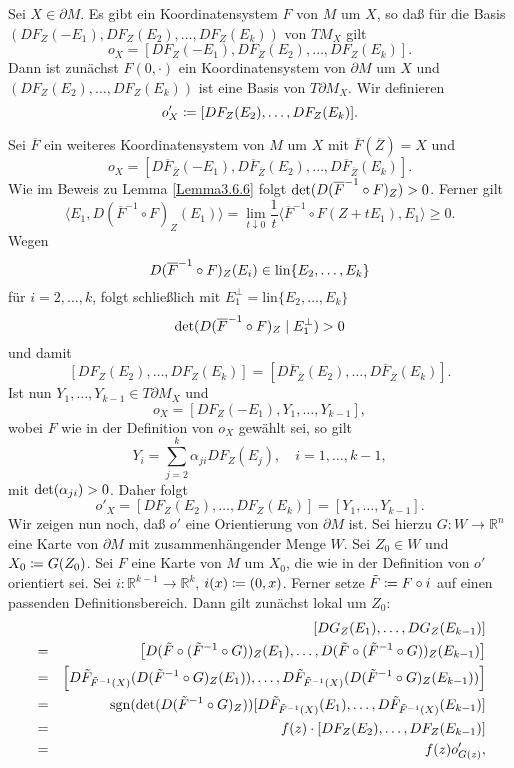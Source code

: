 \documentclass[a4paper,twoside,DIV15,BCOR12mm]{scrbook}
\DeclareMathOperator{\sgn}{sgn}
\begin{document}
\bigskip




  Sei $X \in \partial M$. Es gibt 
ein Koordinatensystem $F$ von $M$ um $X$, so daß für die Basis 
$(DF_{Z}(-E_{1}), DF_{Z}(E_{2}),\dots,DF_{Z}(E_{k}))$ von $TM_{X}$ 
gilt
\[ o_{X} = [DF_{Z}(- E_{1}), DF_{Z}(E_{2}),\dots,DF_{Z}(E_{k})]. \]
Dann ist zunächst $F(0,\cdot)$ ein Koordinatensystem von $\partial M$ 
um $X$ und $(DF_{Z}(E_{2}),\dots,DF_{Z}(E_{k}))$ ist eine Basis von 
$T\partial M_{X}$. Wir definieren
\[ o'_{X} \da  [DF_{Z}(E_{2}),\dots,DF_{Z}(E_{k})]. \]

\bigskip

 Sei $\overline{F}$ ein weiteres 
Koordinatensystem von $M$ um $X$ mit $\overline{F}(\overline{Z}) = X$ 
und
\[ o_{X} = [D\overline{F}_{\overline{Z}}(-E_{1}), 
D\overline{F}_{\overline{Z}}(E_{2}),\dots,D\overline{F}_{\overline{Z}}(E_{k})]. 
\]
Wie im Beweis zu Lemma \ref{Lemma3.6.6} folgt ${\rm det}(D(\overline{F}^{-1} 
\circ F)_{Z}) > 0$. Ferner gilt
\[
\langle E_{1},D(\overline{F}^{-1} \circ F)_{Z}(E_{1})\rangle  =  
\lim_{t \downarrow 0} \frac{1}{t} \langle \overline{F}^{-1} \circ 
F(Z + tE_{1}), E_{1} \rangle  \ge  0.
\]
Wegen
\[ D(\overline{F}^{-1} \circ F)_{Z} (E_{i}) \in {\rm 
lin}\{E_{2},\dots,E_{k}\} \]
für $i = 2,\dots,k$, folgt schließlich mit $E_1^\perp=\text{lin}\{E_2,\ldots,E_k\}$
\[ {\rm det}(D(\overline{F}^{-1} \circ F)_{Z} \mid E_{1}^{\perp}) > 
0 \]
und damit
\[ [DF_{Z}(E_{2}),\dots,DF_{Z}(E_{k})] = 
[D\overline{F}_{\overline{Z}}(E_{2}),\dots,D\overline{F}_{\overline{Z}}(E_{k})]. 
\]
Ist nun $Y_{1},\dots,Y_{k-1} \in T\partial M_{X}$ und
\[ o_{X} = [DF_{Z}(-E_{1}),Y_{1},\dots,Y_{k-1}], \]
wobei $F$ wie in der Definition von $o_{X}$ gewählt sei, so gilt
\[ Y_{i} = \sum_{j=2}^{k} \alpha_{ji} DF_{Z} (E_{j}), \quad i = 
1,\dots,k-1, \]
mit ${\rm det}(\alpha_{ji}) > 0$. 
Daher folgt
\[ o'_{X} = [DF_{Z}(E_{2}),\dots,DF_{Z}(E_{k})] = 
[Y_{1},\dots,Y_{k-1}]. \]
Wir zeigen nun noch, daß $o'$ eine Orientierung von $\partial M$ 
ist. Sei hierzu $G: W \to {\mathbb R}^{n}$ eine Karte von $\partial 
M$ mit zusammenhängender Menge $W$. Sei $Z_{0} \in W$ und $X_{0} \da  
G(Z_{0})$. Sei $F$ eine Karte von $M$ um $X_{0}$, die wie in der 
Definition von $o'$ orientiert sei. Sei $i: {\mathbb R}^{k-1} \to 
{\mathbb R}^{k}$, $i(x) \da  (0,x)$. Ferner setze $\tilde{F} \da  F \circ 
i$  auf einen passenden Definitionsbereich. Dann gilt zunächst lokal 
um $Z_{0}$:
\begin{eqnarray*}
&   & [DG_{Z}(E_{1}),\dots,DG_{Z}(E_{k-1})]  \\
& = & \left[D(\tilde{F} \circ(\tilde{F}^{-1} \circ 
G))_{Z}(E_{1}),\dots,D(\tilde{F} \circ(\tilde{F}^{-1} \circ 
G))_{Z}(E_{k-1})\right] \\
& = & \left[D\tilde{F}_{\tilde{F}^{-1}(X)} (D(\tilde{F}^{-1} \circ 
G)_{Z}(E_{1})),\dots,D\tilde{F}_{\tilde{F}^{-1}(X)} 
(D(\tilde{F}^{-1} \circ G)_{Z}(E_{k-1})) \right] \\
& = & \sgn ({\rm det}(D(\tilde{F}^{-1} \circ 
G)_{Z}))[D\tilde{F}_{\tilde{F}^{-1}(X)}(E_{1}),\dots,
D\tilde{F}_{\tilde{F}^{-1}(X)}(E_{k-1})] \\
& = & f(z) \cdot [DF_{Z}(E_{2}),\dots,DF_{Z}(E_{k-1})] \\
& = & f(z) o'_{G(z)}, 
\end{eqnarray*}
\end{document}
